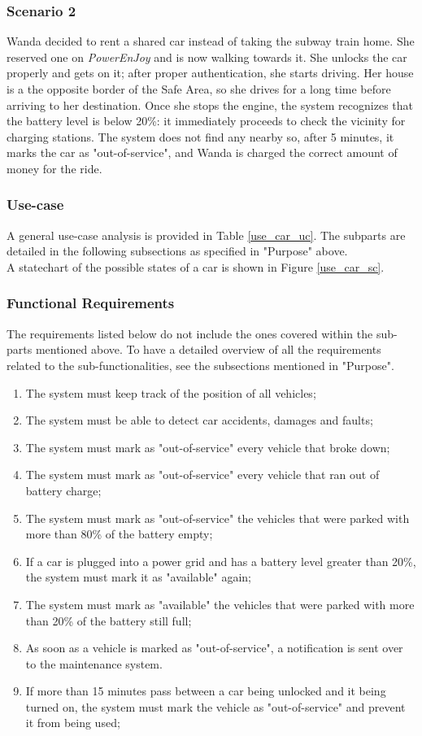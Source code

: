 \subsubsection{Scenario 2}
Wanda decided to rent a shared car instead of taking the subway train home. She reserved one on \emph{PowerEnJoy} and is now walking towards it. She unlocks the car properly and gets on it; after proper authentication, she starts driving. Her house is a the opposite border of the Safe Area, so she drives for a long time before arriving to her destination. Once she stops the engine, the system recognizes that the battery level is below 20\%: it immediately proceeds to check the vicinity for charging stations. The system does not find any nearby so, after 5 minutes, it marks the car as "out-of-service", and Wanda is charged the correct amount of money for the ride.

\subsubsection{Use-case}
A general use-case analysis is provided in Table \ref{use_car_uc}. The subparts are detailed in the following subsections as specified in "Purpose" above. \\
A statechart of the possible states of a car is shown in Figure \ref{use_car_sc}.

\subsubsection{Functional Requirements}
The requirements listed below do not include the ones covered within the sub-parts mentioned above. To have a detailed overview of all the requirements related to the sub-functionalities, see the subsections mentioned in "Purpose".

\begin{enumerate}
\item The system must keep track of the position of all vehicles;
\item The system must be able to detect car accidents, damages and faults;
\item The system must mark as "out-of-service" every vehicle that broke down;
\item The system must mark as "out-of-service" every vehicle that ran out of battery charge;
\item The system must mark as "out-of-service" the vehicles that were parked with more than 80\% of the battery empty;
\item If a car is plugged into a power grid and has a battery level greater than 20\%, the system must mark it as "available" again;
\item The system must mark as "available" the vehicles that were parked with more than 20\% of the battery still full;
\item As soon as a vehicle is marked as "out-of-service", a notification is sent over to the maintenance system.
\item If more than 15 minutes pass between a car being unlocked and it being turned on, the system must mark the vehicle as "out-of-service" and prevent it from being used;
\end{enumerate}

